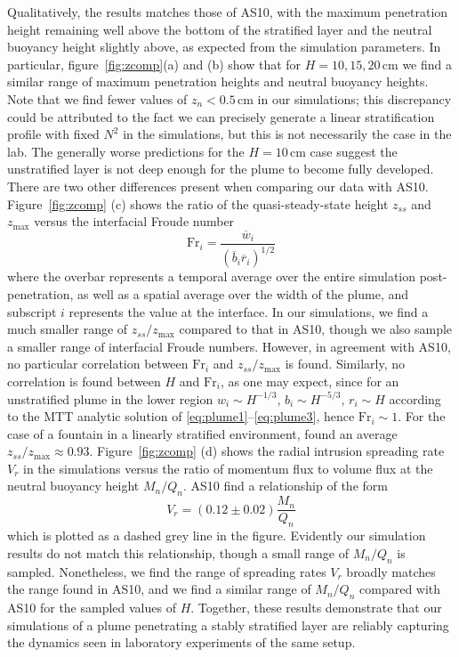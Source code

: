 \documentclass[a4paper]{article}
\begin{document}
Qualitatively, the results matches those of AS10, with the maximum penetration height remaining well above the
bottom of the stratified layer and the neutral buoyancy height slightly above, as expected from the simulation
parameters. In particular, figure~\ref{fig:zcomp}(a) and (b) show that for $H = 10, 15, 20 \,\mathrm{cm}$ we find a similar
range of maximum penetration heights and neutral buoyancy heights. Note that we find fewer values of $z_n <
0.5 \,\mathrm{cm}$ in our simulations; this discrepancy could be attributed to the fact we can precisely
generate a linear stratification profile with fixed $N^2$ in the simulations, but this is not necessarily the
case in the lab. The generally worse predictions for the $H = 10 \, \mathrm{cm}$ case suggest the unstratified
layer is not deep enough for the plume to become fully developed. There are two other differences present when
comparing our data with AS10.  Figure~\ref{fig:zcomp} (c) shows the ratio of the quasi-steady-state height
$z_{ss}$ and $z_{\max}$ versus the interfacial Froude number
\begin{equation}
	\mathrm{Fr}_i = \frac{\overline{w}_i}{\left( \overline{b}_i \overline{r}_i\right)^{1/2}}
\end{equation}
where the overbar represents a temporal average over the entire simulation post-penetration, as well as a
spatial average over the width of the plume, and subscript $i$ represents the value at the interface. In our
simulations, we find a much smaller range of $z_{ss}/z_{\max}$ compared to that in AS10, though we also sample
a smaller range of interfacial Froude numbers. However, in agreement with AS10, no particular correlation
between $\mathrm{Fr}_i$ and $z_{ss}/z_{\max}$ is found. Similarly, no correlation is found between $H$ and
$\mathrm{Fr}_i$, as one may expect, since for an unstratified plume in the lower region $w_i \sim H^{-1/3}, \,
b_i \sim H^{-5/3}, \, r_i \sim H$ according to the MTT analytic solution of
\eqref{eq:plume1}--\eqref{eq:plume3}, hence $\mathrm{Fr}_i \sim 1$. For the case of a fountain in a linearly
stratified environment, \citet{bloomfield1998} found an average $z_{ss}/z_{\max} \approx 0.93$.
Figure~\ref{fig:zcomp} (d) shows the radial intrusion spreading rate $V_r$ in the simulations versus the ratio
of momentum flux to volume flux at the neutral buoyancy height $M_n/Q_n$. AS10 find a relationship of the form
\begin{equation}
	V_r = (0.12 \pm 0.02) \frac{M_n}{Q_n}
\end{equation}
which is plotted as a dashed grey line in the figure. Evidently our simulation results do not match this
relationship, though a small range of $M_n/Q_n$ is sampled. Nonetheless, we find the range of spreading rates
$V_r$ broadly matches the range found in AS10, and we find a similar range of $M_n/Q_n$ compared with AS10 for
the sampled values of $H$. Together, these results demonstrate that our simulations of a plume penetrating a
stably stratified layer are reliably capturing the dynamics seen in laboratory experiments of the same setup.
\end{document}
